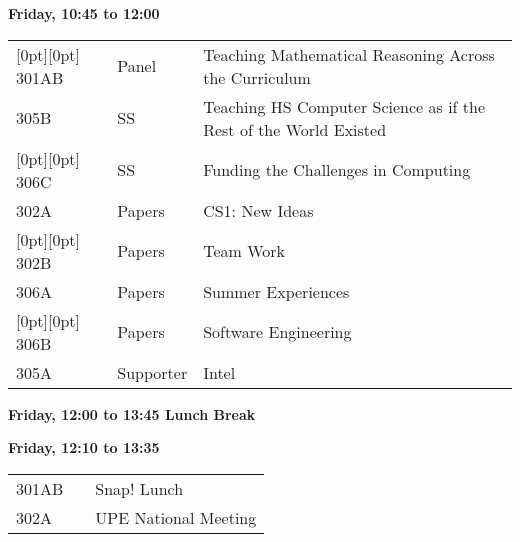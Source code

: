 



\noindent
{\sffamily\bfseries Friday, 10:45 to 12:00}\newline\noindent
\begin{tabular*}{5in}{@{}p{0.5in}@{}p{0.75in}@{}p{3.75in}}
\rowcolor[gray]{0.9}[0pt][0pt] 301AB & Panel & Teaching Mathematical Reasoning Across the Curriculum \\

305B & SS & Teaching HS Computer Science as if the Rest of the World Existed \\

\rowcolor[gray]{0.9}[0pt][0pt] 306C & SS & Funding the Challenges in Computing \\

302A & Papers & CS1:  New Ideas \\

\rowcolor[gray]{0.9}[0pt][0pt] 302B & Papers & Team Work \\

306A & Papers & Summer Experiences \\

\rowcolor[gray]{0.9}[0pt][0pt] 306B & Papers & Software Engineering \\

305A & Supporter & Intel 
\end{tabular*}
{\sffamily\bfseries Friday, 12:00 to 13:45  Lunch Break}\newline\noindent

\noindent
{\sffamily\bfseries Friday, 12:10 to 13:35}\newline\noindent
\begin{tabular*}{5in}{@{}p{0.5in}@{}p{0.75in}@{}p{3.75in}}

301AB &  & Snap! Lunch \\

302A & & UPE National Meeting \\
\end{tabular*}


